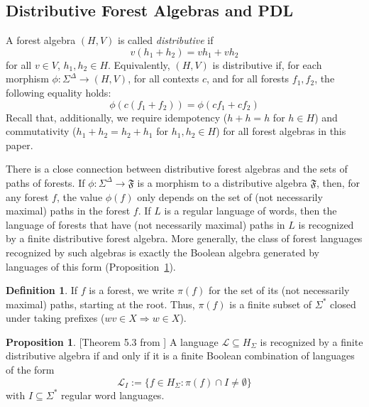 \documentclass[sigplan,9pt]{acmart}\settopmatter{printfolios=true,printccs=false,printacmref=false}
\newcounter{thm}
\newcounter{theorem}
\theoremstyle{definition}
\newtheorem{defin}[thm]{Definition}
\newtheorem{prop}[thm]{Proposition}
\newcommand{\La}[0]{{\mathcal{L}}}
\newcommand{\Ff}[0]{{\mathfrak{F}}}
\begin{document}


\subsection{Distributive Forest Algebras and PDL}\label{sec:dis}

A forest algebra $(H,V)$ is called \emph{distributive} \cite{bojanczyk-wreath-2012} if 
\begin{equation}
v(h_1+h_2) = vh_1 + vh_2
\end{equation}
 for all $v \in V$, $h_1, h_2 \in H$.
Equivalently, $(H,V)$ is distributive if, for each morphism $\phi : \Sigma^\Delta \rightarrow (H,V)$, for all contexts $c$, and for all forests $f_1, f_2$, the following equality holds:
\begin{equation}\label{eq:dis-def-2}
\phi(c(f_1+f_2)) = \phi(cf_1+cf_2)
\end{equation}
Recall that, additionally, we require idempotency ($h+h = h$ for $h \in H$) and commutativity ($h_1+h_2=h_2+h_1$ for $h_1, h_2 \in H$) for all forest algebras in this paper.

There is a close connection between distributive forest algebras and the sets of paths of forests.
If $\phi : \Sigma^\Delta \rightarrow \Ff$ is a morphism to a distributive algebra $\Ff$, then, for any forest $f$, the value $\phi(f)$ only depends on the set of (not necessarily maximal) paths in the forest $f$.
If $L$ is a regular language of words, then the language of forests that have (not necessarily maximal) paths in $L$ is recognized by a finite distributive forest algebra.
More generally, the class of forest languages recognized by such algebras is exactly the Boolean algebra generated by languages of this form (Proposition~\ref{prop:distr-char}). %


\begin{defin}
If $f$ is a forest, we write $\pi(f)$ for the set of its (not necessarily maximal) paths, starting at the root. Thus, $\pi(f)$ is a finite subset of $\Sigma^*$ closed under taking prefixes ($wv \in X \Rightarrow w \in X$).
\end{defin}



\begin{prop}\label{prop:distr-char}[Theorem 5.3 from \cite{bojanczyk-wreath-2012}]
A language $\La \subseteq H_\Sigma$ is recognized by a finite distributive algebra if and only if it is a finite Boolean combination of languages of the form $$\La_I := \{f \in H_\Sigma : \pi(f) \cap I \neq \emptyset\}$$ with $I \subseteq \Sigma^*$ regular word languages.
\end{prop}
\end{document}

